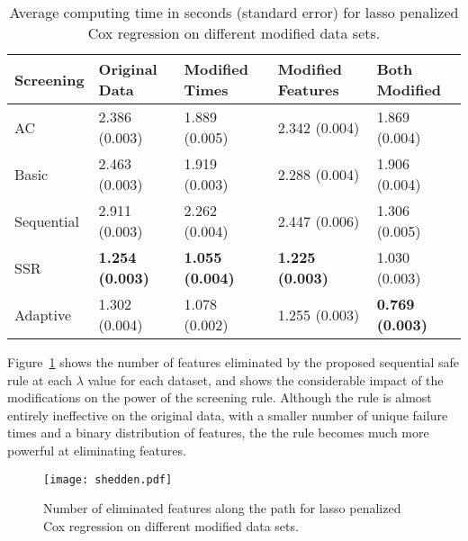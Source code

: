 \begin{table}[H]
\centering
\begin{tabular}{lllll}
\toprule
Screening  & Original Data & Modified Times & Modified Features & Both Modified \\
\midrule
AC & 2.386 (0.003) & 1.889 (0.005) & 2.342 (0.004) & 1.869 (0.004) \\
Basic & 2.463 (0.003) & 1.919 (0.003) & 2.288 (0.004) & 1.906 (0.004) \\
Sequential & 2.911 (0.003) & 2.262 (0.004) & 2.447 (0.006) & 1.306 (0.005) \\
SSR & \textbf{1.254 (0.003)} & \textbf{1.055 (0.004)} & \textbf{1.225 (0.003)} & 1.030 (0.003) \\
Adaptive & 1.302 (0.004) & 1.078 (0.002) & 1.255 (0.003) & \textbf{0.769 (0.003)} \\
\bottomrule
\end{tabular}
\caption{Average computing time in seconds (standard error) for lasso penalized Cox regression on different modified data sets.}
\label{Tab:realcox}
\end{table}

Figure~\ref{Fig:shedden} shows the number of features eliminated by the proposed sequential safe rule at each $\lambda$ value for each dataset, and shows the considerable impact of the modifications on the power of the screening rule. Although the rule is almost entirely ineffective on the original data, with a smaller number of unique failure times and a binary distribution of features, the the rule becomes much more powerful at eliminating features.

\begin{figure}[ht]
    \centering
    \texttt{[image: shedden.pdf]}    
    \caption{Number of eliminated features along the path for lasso penalized Cox regression on different modified data sets\label{Fig:shedden}.}
\end{figure}